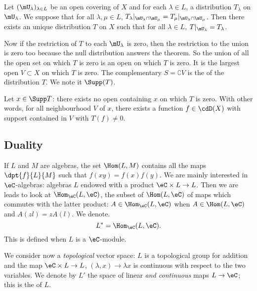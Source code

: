 \begin{theorem}
Let $(\mU_{\lambda})_{\lambda\in L}$ be an open covering of $X$ and for each $\lambda\in L$, a distribution $T_{\lambda}$ on $\mU_{\lambda}$. We suppose that for all $\lambda,\mu\in L$, $T_{\lambda}|_{\mU_{\lambda}\cap\mU_{\mu}}=T_{\mu}|_{\mU_{\lambda}\cap\mU_{\mu}}$. Then there exists an unique distribution $T$ on $X$ such that for all $\lambda\in L$, $T|_{\mU_{\lambda}}=T_{\lambda}$.
\end{theorem}

Now if the restriction  of $T$ to each $\mU_{\lambda}$ is zero, then the restriction to the union is zero too because the null distribution answers the theorem. So the union of all the open set on which $T$ is zero is an open on which $T$ is zero. It is the largest open $V\subset X$ on which $T$ is zero. The complementary $S=\complement V$ is the  of the distribution $T$. We note it $\Supp(T)$.

Let $x\in\Supp T$: there exists no open containing $x$ on which $T$ is zero. With other words, for all  neighbourhood $V$ of $x$, there exists a function $f\in\cdD(X)$ with support contained in $V$ with $T(f)\neq 0$.

\subsection{Duality}

If $L$ and $M$ are algebras, the set $\Hom(L,M)$ contains all the maps $\dpt{f}{L}{M}$ such that $f(xy)=f(x)f(y)$. We are mainly interested in $\eC$-algebras: algebras $L$ endowed with a product $\eC\times L\to L$. Then we are leads to look at $\Hom_{\eC}(L,\eC)$, the subset of $\Hom(L,\eC)$ of maps which commutes with the latter product: $A\in\Hom_{\eC}(L,\eC)$ when $A\in\Hom(L,\eC)$ and $A(zl)=zA(l)$. We denote.
\begin{equation}
  L^*=\Hom_{\eC}(L,\eC).
\end{equation}
This is defined when $L$ is a $\eC$-module.

We consider now a \emph{topological} vector space: $L$ is a topological group for addition and the map $\eC\times L\to L$, $(\lambda,x)\to \lambda x$ is continuous with respect to the two variables. We denote by $L'$ the space of linear \emph{and continuous} maps $L\to \eC$; this is the  of $L$.

